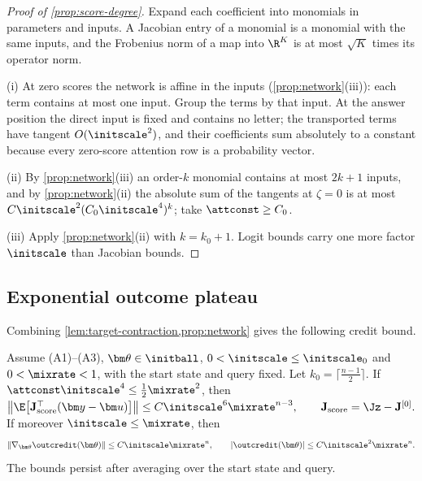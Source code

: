 \begin{proof}[Proof of \cref{prop:score-degree}]
Expand each coefficient into monomials in parameters and inputs. A Jacobian entry of a monomial is a monomial with the same inputs, and the
Frobenius norm of a map into $\R^K$ is at most $\sqrt K$ times its operator norm.

\noindent(i) At zero scores the network is affine in the inputs (\cref{prop:network}(iii)): each term contains at most one input. Group the terms by
that input. At the answer position the direct input is fixed and contains no letter; the transported terms have tangent $O(\initscale^2)$, and
their coefficients sum absolutely to a constant because every zero-score attention row is a probability vector.

\noindent(ii) By \cref{prop:network}(iii) an order-$k$ monomial contains at most $2k+1$ inputs, and by \cref{prop:network}(ii) the absolute sum of the
tangents at $\zeta=0$ is at most $C\initscale^2(C_0\initscale^4)^k$; take $\attconst\ge C_0$.

\noindent(iii) Apply \cref{prop:network}(ii) with $k=k_0+1$. Logit bounds carry one more factor $\initscale$ than Jacobian bounds.
\end{proof}

\subsection{Exponential outcome plateau}
\label{app:thm1}

Combining \cref{lem:target-contraction,prop:network} gives the following credit bound.

\begin{lemma}
\label{lem:score-sum}
Assume (A1)--(A3), $\bm\theta\in\initball$, $0<\initscale\le\initscale_0$ and $0<\mixrate<1$, with the start state and query fixed. Let
$k_0=\lceil\frac{n-1}{2}\rceil$. If $\attconst\initscale^4\le\frac{1}{2}\mixrate^2$, then
 $\bigl\|\E\bigl[\mathbf J_{\mathrm{score}}^\top(\bm y-\bm u)\bigr]\bigr\|\le C\initscale^6\mixrate^{n-3},\qquad \mathbf J_{\mathrm{score}}=\Jz-\mathbf J^{[0]}.$ 
If moreover $\initscale\le\mixrate$, then
\begin{equation}
 \|\nabla_{\bm\theta}\outcredit(\bm\theta)\|\le C\initscale\mixrate^n,\qquad |\outcredit(\bm\theta)|\le C\initscale^2\mixrate^n.
 \label{eq:thm1-full}
\end{equation}
The bounds persist after averaging over the start state and query.
\end{lemma}

